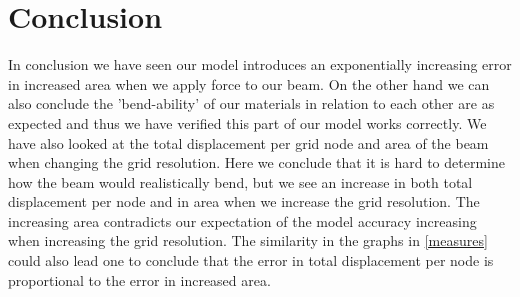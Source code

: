 \section{Conclusion}
In conclusion we have seen our model introduces an exponentially increasing error in increased area when we apply force to our beam. On the other hand we can also conclude the 'bend-ability' of our materials in relation to each other are as expected and thus we have verified this part of our model works correctly. We have also looked at the total displacement per grid node and area of the beam when changing the grid resolution. Here we conclude that it is hard to determine how the beam would realistically bend, but we see an increase in both total displacement per node and in area when we increase the grid resolution. The increasing area contradicts our expectation of the model accuracy increasing when increasing the grid resolution. The similarity in the graphs in \autoref{measures} could also lead one to conclude that the error in total displacement per node is proportional to the error in increased area.